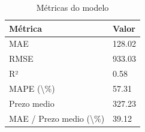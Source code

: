 \begin{table}[H]
\caption{Métricas do modelo}
\label{tab:metricas_modelo}
\begin{tabular}{ll}
\toprule
Métrica & Valor \\
\midrule
MAE & 128.02 \\
RMSE & 933.03 \\
R² & 0.58 \\
MAPE (\textbackslash \%) & 57.31 \\
Prezo medio & 327.23 \\
MAE / Prezo medio (\textbackslash \%) & 39.12 \\
\bottomrule
\end{tabular}
\end{table}
